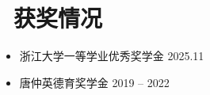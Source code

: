 \documentclass[11pt]{article}
\begin{document}
\section{\makebox[\widthof{\faTrophy}][c]{\color{CVBlue}\faTrophy}\ 获奖情况}
\begin{itemize}[nosep]
    \item 浙江大学一等学业优秀奖学金 \hfill 2025.11
    \item 唐仲英德育奖学金 \hfill 2019 -- 2022
\end{itemize}
\end{document}
